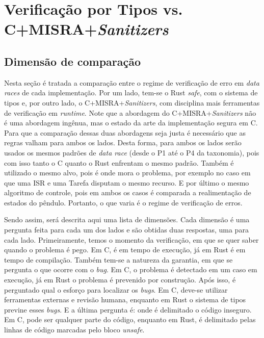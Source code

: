 \section{Verificação por Tipos vs. C+MISRA+\textit{Sanitizers}}
\label{sec:type-system-vs-sanitizer}

\subsection{Dimensão de comparação}
\label{subsec:dim-comp}

Nesta seção é tratada a comparação entre o regime de verificação de erro em \textit{data races} de cada implementação. Por um lado, tem-se o Rust \textit{safe}, com o sistema de tipos e, por outro lado, o C+\ac{MISRA}+\textit{Sanitizers}, com disciplina mais ferramentas de verificação em \textit{runtime}. Note que a abordagem do C+\ac{MISRA}+\textit{Sanitizers} não é uma abordagem ingênua, mas o estado da arte da implementação segura em C. Para que a comparação dessas duas abordagens seja justa é necessário que as regras valham para ambos os lados. Desta forma, para ambos os lados serão usados os mesmos padrões de \textit{data race} (desde o P1 até o P4 da taxonomia), pois com isso tanto o C quanto o Rust enfrentam o mesmo padrão. Também é utilizado o mesmo alvo, pois é onde mora o problema, por exemplo no caso em que uma \ac{ISR} e uma Tarefa disputam o mesmo recurso. E por último o mesmo algoritmo de controle, pois em ambos os casos é comparada a realimentação de estados do pêndulo. Portanto, o que varia é o regime de verificação de erros.

Sendo assim, será descrita aqui uma lista de dimensões. Cada dimensão é uma pergunta feita para cada um dos lados e são obtidas duas respostas, uma para cada lado. Primeiramente, temos o momento da verificação, em que se quer saber quando o problema é pego. Em C, é em tempo de execução, já em Rust é em tempo de compilação. Também tem-se a natureza da garantia, em que se pergunta o que ocorre com o \textit{bug}. Em C, o problema é detectado em um caso em execução, já em Rust o problema é prevenido por construção. Após isso, é perguntado qual o esforço para localizar os \textit{bugs}. Em C, deve-se utilizar ferramentas externas e revisão humana, enquanto em Rust o sistema de tipos previne esses \textit{bugs}. E a última pergunta é: onde é delimitado o código inseguro. Em C, pode ser qualquer parte do código, enquanto em Rust, é delimitado pelas linhas de código marcadas pelo bloco \textit{unsafe}.

